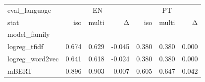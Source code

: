 \begin{tabular}{lrrrrrr}
\toprule
eval\_language & \multicolumn{3}{c}{EN} & \multicolumn{3}{c}{PT} \\
stat & iso & multi & Δ & iso & multi & Δ \\
model\_family &  &  &  &  &  &  \\
\midrule
logreg\_tfidf & 0.674 & 0.629 & -0.045 & 0.380 & 0.380 & 0.000 \\
logreg\_word2vec & 0.641 & 0.618 & -0.024 & 0.380 & 0.380 & 0.000 \\
mBERT & 0.896 & 0.903 & 0.007 & 0.605 & 0.647 & 0.042 \\
\bottomrule
\end{tabular}
